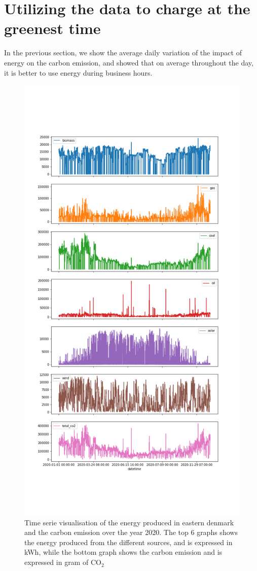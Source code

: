 \documentclass[11pt]{article} %
\begin{document}
\section{Utilizing the data to charge at the greenest time}
In the previous section, we show the average daily variation of the impact of energy on the carbon emission, and showed that on average throughout the day, it is better to use energy during business hours. 
\begin{figure}
  \includegraphics[width=0.7\linewidth]{../outputs/energy_production_time_serie.png}
  \caption{Time serie visualisation of the energy produced in eastern denmark and the carbon emission over the year 2020. The top 6 graphs shows the energy produced from the different sources, and is expressed in kWh, while the bottom graph shows the carbon emission and is expressed in gram of CO$_2$}
  \label{fig:time_series}
\end{figure}
\end{document}
